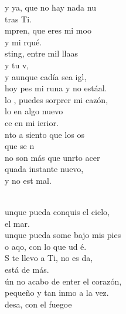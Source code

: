 \documentclass[12pt]{article}
\begin{document}
\begin{multicols*}{2}
\begin{cancion}%
	y ya, que no hay nada nu  \\
	tras  Ti.\\
	mpren, que eres mi moo \\
	y mi rqué.\\
	sting, entre mil llaas \\
	y tu v,\\
	y aunque cadía sea igl,\\
	hoy pes mi runa y no estáal.\\
	lo , puedes sorprer mi cazón,\\
	lo en  algo nuevo \\
	ce en mi ierior.\\
	nto a  siento que los os \\
	que se n\\
	no son más que unrto acer\\
	quada instante  nuevo, \\
	y no est mal.\\\jump\\
	\begin{chorus}%
	unque pueda conquis el cielo, \\
el mar.\\
	unque pueda some bajo mis pies\\
	o aqo, con lo que ud é. \\
	S te llevo a Ti, no es da, \\
está de más.\\
	ún no acabo de enter el corazón,\\
	 pequeño y tan inmo a la vez.\\
	desa, con el fuegoe \\

\end{chorus}
\end{cancion}
\end{multicols*}
\end{document}
